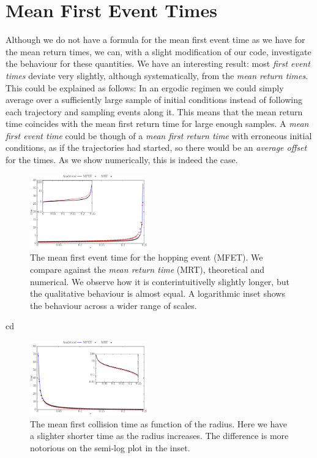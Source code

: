 \documentclass[letterpaper,10pt, jcp, aps]{revtex4-1}
\begin{document}

\section{Mean First Event Times}

Although we do not have a formula for the mean first event time as
we have for the mean return times, we can, with a slight modification
of our code, investigate the behaviour for these quantities. We have 
an interesting result: most \emph{first event times} deviate very slightly,
although systematically, from the \emph{mean return times}.
This could be explained as follows:
In an ergodic regimen we could simply average over a sufficiently large
sample of initial conditions instead of following each trajectory
and sampling events along it. This means that the mean return time
coincides with the mean first return time for large enough samples.
A \emph{mean first event time} could be though of a \emph{mean
first return time} with erroneous initial conditions, as if the
trajectories had started, so there would be an \emph{average offset}
for the times. As we show numerically, this is indeed the case. 


\begin{figure}[h]
  \centering
  \includegraphics[width=0.45\textwidth]{./FigurasPerfectas/FistHopTime01-ForPaper.pdf}
  \caption{The mean first event time for the hopping event (MFET).
    We compare against the \emph{mean return time} (MRT), theoretical
and numerical. We observe how it is conterintuitivelly slightly longer,
but the qualitative behaviour is almost equal. A logarithmic inset
shows the behaviour across a wider range of scales. }\label{FirstHopp01}
\end{figure}cd

\begin{figure}[h]
  \centering
  \includegraphics[width=0.45\textwidth]{./FigurasPerfectas/FistCollTime02-ForPaper.pdf}
  \caption{The mean first collision time as function of the radius.
    Here we have  a slighter shorter time as the radius increases. The difference
is more notorious on the semi-log plot in the inset. 
 }\label{FirstCol01}
\end{figure}
\end{document}
